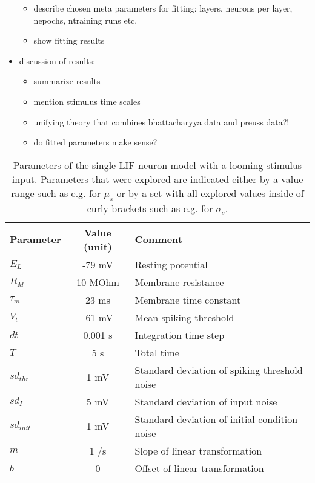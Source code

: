 \documentclass[a4paper,10pt,hidelinks]{scrreprt}
\begin{document}
\begin{itemize}
\begin{itemize}
			\item describe chosen meta parameters for fitting: layers, neurons per layer, nepochs, 
			ntraining runs etc.
			\item show fitting results
		\end{itemize}
		\item discussion of results:
		\begin{itemize}
			\item summarize results
			\item mention stimulus time scales
			\item unifying theory that combines bhattacharyya data and preuss data?!
			\item do fitted parameters make sense?
		\end{itemize}
	\end{itemize}
	\begin{table} [!th]
		\begin{center}
			\begin{tabular}{l|c|p{7cm}}
				\textbf{Parameter} & \textbf{Value (unit)} & \textbf{Comment} \\
				\hline
				$E_L$ & -79 mV & Resting potential\\
				$R_M$ & 10 MOhm & Membrane resistance\\
				$\tau_{m}$ & 23 ms & Membrane time constant\\
				$V_t$ & -61 mV & Mean spiking threshold\\
				$dt$ & 0.001 s & Integration time step\\
				$T$ & 5 s & Total time\\
				$sd_{thr}$ & 1 mV & Standard deviation of spiking threshold noise\\
				$sd_{I}$ & 5 mV & Standard deviation of input noise\\
				$sd_{init}$ & 1 mV & Standard deviation of initial condition noise\\
				$m$ & 1 \textdegree/s  & Slope of linear transformation\\
				$b$ & 0 \textdegree & Offset of linear transformation\\
			\end{tabular}
		\end{center}
		\caption{Parameters of the single LIF neuron model with a looming stimulus input. Parameters that were explored are indicated either by a value range such as e.g. for $\mu_s$ or by a set with all explored values inside of curly brackets such as e.g. for $\sigma_s$.}
		\label{tab:neuroparams}
	\end{table}
\end{document}

